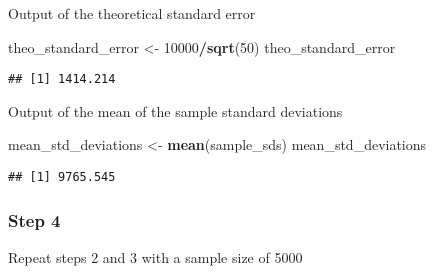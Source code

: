\documentclass[]{article}
\newenvironment{Shaded}{\begin{snugshade}}{\end{snugshade}}
\newcommand{\KeywordTok}[1]{\textcolor[rgb]{0.13,0.29,0.53}{\textbf{#1}}}
\newcommand{\DecValTok}[1]{\textcolor[rgb]{0.00,0.00,0.81}{#1}}
\newcommand{\StringTok}[1]{\textcolor[rgb]{0.31,0.60,0.02}{#1}}
\newcommand{\CommentTok}[1]{\textcolor[rgb]{0.56,0.35,0.01}{\textit{#1}}}
\newcommand{\ControlFlowTok}[1]{\textcolor[rgb]{0.13,0.29,0.53}{\textbf{#1}}}
\newcommand{\OperatorTok}[1]{\textcolor[rgb]{0.81,0.36,0.00}{\textbf{#1}}}
\newcommand{\NormalTok}[1]{#1}
\begin{document}
Output of the theoretical standard error

\begin{Shaded}
\begin{Highlighting}[]
\NormalTok{theo_standard_error <-}\StringTok{ }\DecValTok{10000}\OperatorTok{/}\KeywordTok{sqrt}\NormalTok{(}\DecValTok{50}\NormalTok{)}
\NormalTok{theo_standard_error}
\end{Highlighting}
\end{Shaded}

\begin{verbatim}
## [1] 1414.214
\end{verbatim}

Output of the mean of the sample standard deviations

\begin{Shaded}
\begin{Highlighting}[]
\NormalTok{mean_std_deviations <-}\StringTok{ }\KeywordTok{mean}\NormalTok{(sample_sds)}
\NormalTok{mean_std_deviations}
\end{Highlighting}
\end{Shaded}

\begin{verbatim}
## [1] 9765.545
\end{verbatim}

\subsubsection{Step 4}\label{step-4}

Repeat steps 2 and 3 with a sample size of 5000

\begin{Shaded}
\end{Shaded}
\end{document}
